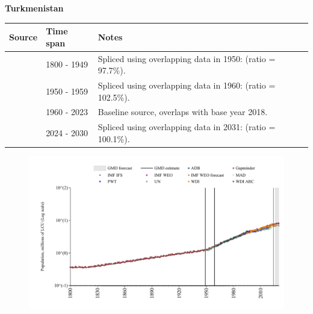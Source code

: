 \documentclass[12pt,a4paper,landscape]{article}
\begin{document}
\begin{adjustbox}{max totalsize={\paperwidth}{\paperheight},center}
\begin{minipage}[t][\textheight][t]{\textwidth}
\vspace*{0.5cm}
{}
\begin{center}
{\Large\bfseries Turkmenistan}
\end{center}
\vspace{0.5cm}
\begin{table}[H]
\centering
\small
\begin{tabular}{|l|l|l|}
\hline
\textbf{Source} & \textbf{Time span} & \textbf{Notes} \\
\hline
\rowcolor{white}\cite{Gapminder}& 1800 - 1949 &Spliced using overlapping data in 1950: (ratio = 97.7\%).\\
\rowcolor{lightgray}\cite{IMF_IFS}& 1950 - 1959 &Spliced using overlapping data in 1960: (ratio = 102.5\%).\\
\rowcolor{white}\cite{WDI}& 1960 - 2023 &Baseline source, overlaps with base year 2018.\\
\rowcolor{lightgray}\cite{Gapminder}& 2024 - 2030 &Spliced using overlapping data in 2031: (ratio = 100.1\%).\\
\hline
\end{tabular}
\end{table}
\begin{figure}[H]
\centering
\includegraphics[width=\textwidth,height=0.6\textheight,keepaspectratio]{graphs/TKM_pop.pdf}
\end{figure}
\end{minipage}
\end{adjustbox}
\end{document}
